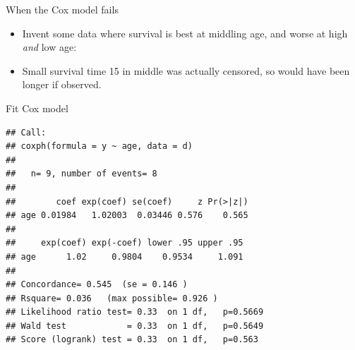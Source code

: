 \begin{frame}[fragile]{When the Cox model fails}
  \begin{itemize}
  \item Invent some data where survival is best at middling age, and
    worse at high \emph{and} low age:

\begin{knitrout}
\color{fgcolor}\begin{kframe}
\begin{alltt}
\hlkwb{=}\hlstd{(}\hlstd{,}\hlstd{,}\hlstd{)}
\hlkwb{=}\hlstd{(}\hlstd{,}\hlstd{,}\hlstd{,}\hlstd{,}\hlstd{,}\hlstd{,}\hlstd{,}\hlstd{,}\hlstd{)}
\hlkwb{=}\hlstd{(}\hlstd{,}\hlstd{,}\hlstd{,}\hlstd{,}\hlstd{,}\hlstd{,}\hlstd{,}\hlstd{,}\hlstd{)}
\hlkwb{=}
\hlkwb{=}
\end{alltt}
\end{kframe}
\end{knitrout}

\item Small survival time 15 in middle was actually censored, so would
  have been longer if observed.
  \end{itemize}
\end{frame}

\begin{frame}[fragile]{Fit Cox model}
  
  \begin{footnotesize}
\begin{knitrout}
\color{fgcolor}\begin{kframe}
\begin{alltt}
\hlkwb{=}\hlopt{~}
\end{alltt}
\begin{verbatim}
## Call:
## coxph(formula = y ~ age, data = d)
## 
##   n= 9, number of events= 8 
## 
##        coef exp(coef) se(coef)     z Pr(>|z|)
## age 0.01984   1.02003  0.03446 0.576    0.565
## 
##     exp(coef) exp(-coef) lower .95 upper .95
## age      1.02     0.9804    0.9534     1.091
## 
## Concordance= 0.545  (se = 0.146 )
## Rsquare= 0.036   (max possible= 0.926 )
## Likelihood ratio test= 0.33  on 1 df,   p=0.5669
## Wald test            = 0.33  on 1 df,   p=0.5649
## Score (logrank) test = 0.33  on 1 df,   p=0.563
\end{verbatim}
\end{kframe}
\end{knitrout}
    
  \end{footnotesize}
  
\end{frame}

